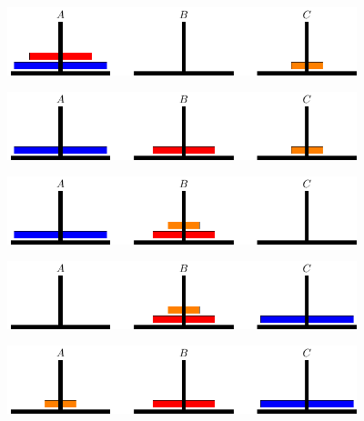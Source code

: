 \begin{frame}
  \begin{figure}[htbp]
    \centering
    \includegraphics[width=4in]{ch09/images/ht1.pdf}
  \end{figure}
\end{frame}

\begin{frame}
  \begin{figure}[htbp]
    \centering
    \includegraphics[width=4in]{ch09/images/ht2.pdf}
  \end{figure}
\end{frame}

\begin{frame}
  \begin{figure}[htbp]
    \centering
    \includegraphics[width=4in]{ch09/images/ht3.pdf}
  \end{figure}
\end{frame}

\begin{frame}
  \begin{figure}[htbp]
    \centering
    \includegraphics[width=4in]{ch09/images/ht4.pdf}
  \end{figure}
\end{frame}

\begin{frame}
  \begin{figure}[htbp]
    \centering
    \includegraphics[width=4in]{ch09/images/ht5.pdf}
  \end{figure}
\end{frame}

